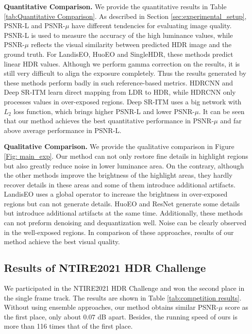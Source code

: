 \documentclass[final]{cvpr}
\begin{document}
\textbf{Quantitative Comparison.}
We provide the quantitative results in Table \ref{tab:Quantitative Comparison}. As described in Section \ref{sec:experimental_setup}, PSNR-L and PSNR-$\mu$ have different tendencies for evaluating image quality. PSNR-L is used to measure the accuracy of the high luminance values, while PSNR-$\mu$ reflects the visual similarity between predicted HDR image and the ground truth. For LandisEO, HuoEO and SingleHDR, these methods predict linear HDR values. Although we perform gamma correction on the results, it is still very difficult to align the exposure completely. Thus the results generated by these methods perform badly in such reference-based metrics. HDRCNN and Deep SR-ITM learn direct mapping from LDR to HDR, while HDRCNN only processes values in over-exposed regions. Deep SR-ITM uses a big network with $L_2$ loss function, which brings higher PSNR-L and lower PSNR-$\mu$. It can be seen that our method achieves the best quantitative performance in PSNR-$\mu$ and far above average performance in PSNR-L.

\textbf{Qualitative Comparison.}
We provide the qualitative comparison in Figure \ref{Fig: main_exp}. Our method can not only restore fine details in highlight regions but also greatly reduce noise in lower luminance area. On the contrary, although the other methods improve the brightness of the highlight areas, they hardly recover details in these areas and some of them introduce additional artifacts. LandisEO uses a global operator to increase the brightness in over-exposed regions but can not generate details. HuoEO and ResNet generate some details but introduce additional artifacts at the same time. Additionally, these methods can not preform denoising and dequantization well. Noise can be clearly observed in the well-exposed regions. In comparison of these approaches, results of our method achieve the best visual quality.  

\subsection{Results of NTIRE2021 HDR Challenge}
We participated in the NTIRE2021 HDR Challenge \cite{perez2021ntire} and won the second place in the single frame track. The results are shown in Table \ref{tab:competition results}. Without using ensemble approaches, our method obtains similar PSNR-$\mu$ score as the first place, only about $0.07$ dB apart. Besides, the running speed of ours is more than 116 times that of the first place.
\end{document}
